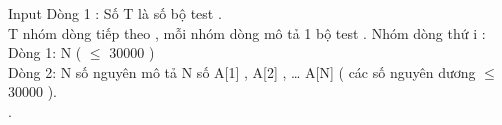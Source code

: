 Input
Dòng 1 : Số T là số bộ test .   
\\   T nhóm dòng tiếp theo , mỗi nhóm dòng mô tả 1 bộ test . Nhóm dòng thứ i :   
\\   Dòng 1: N (  $\le$  30000 )   
\\   Dòng 2: N số nguyên mô tả N số A[1] , A[2] , … A[N] ( các số nguyên dương  $\le$  30000 ).   
\\   .
